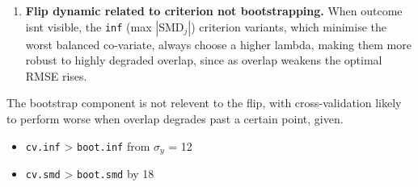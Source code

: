\documentclass[
  letterpaper,
  DIV=11,
  numbers=noendperiod]{scrartcl}
\providecommand{\tightlist}{%
  \setlength{\itemsep}{0pt}\setlength{\parskip}{0pt}}
\begin{document}
\begin{enumerate}
\def\labelenumi{\arabic{enumi}.}
\setcounter{enumi}{1}
\tightlist
\item
  \textbf{Flip dynamic related to criterion not bootstrapping.} When
  outcome isnt visible, the \texttt{inf} (max \(|\mathrm{SMD}_j|\))
  criterion variants, which minimise the worst balanced co-variate,
  always choose a higher lambda, making them more robust to highly
  degraded overlap, since as overlap weakens the optimal RMSE rises.
\end{enumerate}

The bootstrap component is not relevent to the flip, with
cross-validation likely to perform worse when overlap degrades past a
certain point, given.

\begin{itemize}
\tightlist
\item
  \texttt{cv.inf} \textgreater{} \texttt{boot.inf} from \(\sigma_y\) =
  12
\item
  \texttt{cv.smd} \textgreater{} \texttt{boot.smd} by 18
\end{itemize}
\end{document}
